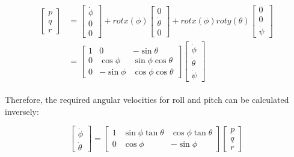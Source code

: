 \documentclass[letterpaper, 10 pt, conference]{ieeeconf}  %
\begin{document}
\begin{align}
\begin{split}
\begin{bmatrix} p\\q\\r\end{bmatrix}
&=
\begin{bmatrix} \dot{\phi}\\0\\0\end{bmatrix}
+
rotx(\phi)\begin{bmatrix} 0\\\dot{\theta}\\0\end{bmatrix}
+
rotx(\phi)roty(\theta)\begin{bmatrix} 0\\0\\\dot{\psi}\end{bmatrix}\\
&=
\begin{bmatrix}
1 & 0 & -\sin{\theta}\\
0 & \cos{\phi} & \sin{\phi}\cos{\theta}\\
0 & -\sin{\phi} & \cos{\phi}\cos{\theta}
\end{bmatrix}\begin{bmatrix} \dot{\phi}\\\dot{\theta}\\\dot{\psi}\end{bmatrix}
\end{split}
\end{align}

Therefore, the required angular velocities for roll and pitch can be calculated inversely:

\begin{equation}
\begin{bmatrix} \dot{\phi}\\\dot{\theta}\end{bmatrix}
=
\begin{bmatrix}
1 & \sin{\phi}\tan{\theta} & \cos{\phi}\tan{\theta}\\
0 & \cos{\phi} & -\sin{\phi}
\end{bmatrix}
\begin{bmatrix} p\\q\\r\end{bmatrix}
\end{equation}
\end{document}
